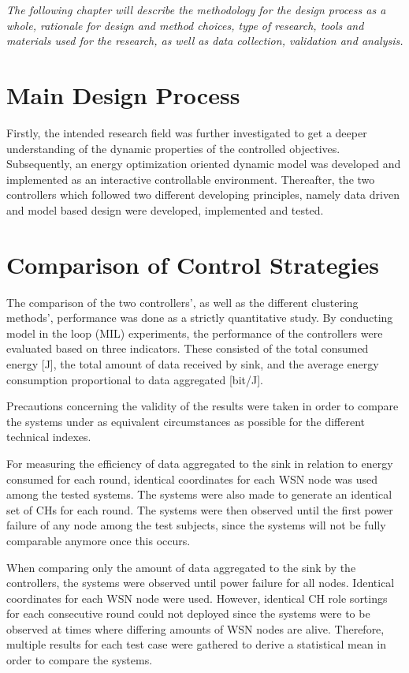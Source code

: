 \label{ch:Methodology}
\textit{The following chapter will describe the methodology for the design process as a whole, rationale for design and method choices, type of research, tools and materials used for the research, as well as data collection, validation and analysis.}

\section{Main Design Process}
Firstly, the intended research field was further investigated to get a deeper understanding of the dynamic properties of the controlled objectives. Subsequently, an energy optimization oriented dynamic model was developed and implemented as an interactive controllable environment. Thereafter, the two controllers which followed two different developing principles, namely data driven and model based design were developed, implemented and tested. \newline

\section{Comparison of Control Strategies}
The comparison of the two controllers', as well as the different clustering methods', performance was done as a strictly quantitative study. By conducting model in the loop (MIL) experiments, the performance of the controllers were evaluated based on three indicators. These consisted of the total consumed energy [J], the total amount of data received by sink, and the average energy consumption proportional to data aggregated [bit/J].\newline

\noindent Precautions concerning the validity of the results were taken in order to compare the systems under as equivalent circumstances as possible for the different technical indexes.\newline

\noindent For measuring the efficiency of data aggregated to the sink in relation to energy consumed for each round, identical coordinates for each WSN node was used among the tested systems. The systems were also made to generate an identical set of CHs for each round. The systems were then observed until the first power failure of any node among the test subjects, since the systems will not be fully comparable anymore once this occurs.\newline

\noindent When comparing only the amount of data aggregated to the sink by the controllers, the systems were observed until power failure for all nodes. Identical coordinates for each WSN node were used. However, identical CH role sortings for each consecutive round could not deployed since the systems were to be observed at times where differing amounts of WSN nodes are alive. Therefore, multiple results for each test case were gathered to derive a statistical mean in order to compare the systems.\newline

